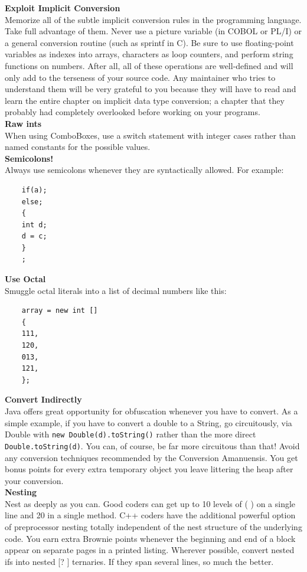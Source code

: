 \documentclass[11pt,twoside,a4paper]{article}
\begin{document}
\textbf{Exploit Implicit Conversion}~\\
Memorize all of the subtle implicit conversion rules in the programming language. Take full advantage of them. Never use a picture variable (in COBOL or PL/I) or a general conversion routine (such as sprintf in C). Be sure to use floating-point variables as indexes into arrays, characters as loop counters, and perform string functions on numbers. After all, all of these operations are well-defined and will only add to the terseness of your source code. Any maintainer who tries to understand them will be very grateful to you because they will have to read and learn the entire chapter on implicit data type conversion; a chapter that they probably had completely overlooked before working on your programs. ~\\

\textbf{Raw ints}~\\
When using ComboBoxes, use a switch statement with integer cases rather than named constants for the possible values. ~\\

\textbf{Semicolons!}~\\
Always use semicolons whenever they are syntactically allowed. For example: 
\begin{verbatim}
	if(a); 
	else; 
	{ 
	int d; 
	d = c; 
	} 
	; 
\end{verbatim}

\textbf{Use Octal}~\\
Smuggle octal literals into a list of decimal numbers like this: 
\begin{verbatim}
	array = new int [] 
	{ 
	111, 
	120, 
	013, 
	121, 
	};
\end{verbatim}

\textbf{Convert Indirectly}~\\
Java offers great opportunity for obfuscation whenever you have to convert. As a simple example, if you have to convert a double to a String, go circuitously, via Double with \texttt{new Double(d).toString()} rather than the more direct \texttt{Double.toString(d)}. You can, of course, be far more circuitous than that! Avoid any conversion techniques recommended by the Conversion Amanuensis. You get bonus points for every extra temporary object you leave littering the heap after your conversion.~\\ 

\textbf{Nesting}~\\
Nest as deeply as you can. Good coders can get up to 10 levels of ( ) on a single line and 20 { } in a single method. C++ coders have the additional powerful option of preprocessor nesting totally independent of the nest structure of the underlying code. You earn extra Brownie points whenever the beginning and end of a block appear on separate pages in a printed listing. Wherever possible, convert nested ifs into nested [? ] ternaries. If they span several lines, so much the better.~\\ 
\end{document}
